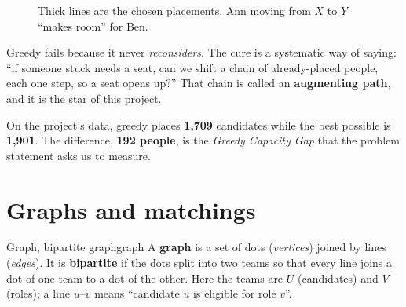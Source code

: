 \documentclass[11pt]{article}
\begin{document}
\begin{figure}[h]
\centering
{}
\caption{Thick lines are the chosen placements. Ann moving from $X$ to $Y$ ``makes room'' for Ben.}
\end{figure}

\begin{keyidea}
Greedy fails because it never \emph{reconsiders}. The cure is a systematic way of saying: ``if someone stuck needs a seat, can we shift a chain of already-placed people, each one step, so a seat opens up?'' That chain is called an \textbf{augmenting path}, and it is the star of this project.
\end{keyidea}

On the project's data, greedy places \textbf{1{,}709} candidates while the best possible is \textbf{1{,}901}. The difference, \textbf{192 people}, is the \emph{Greedy Capacity Gap} that the problem statement asks us to measure.

\section{Graphs and matchings}

\begin{definition}{Graph, bipartite graph}{graph}
A \textbf{graph} is a set of dots (\emph{vertices}) joined by lines (\emph{edges}). It is \textbf{bipartite} if the dots split into two teams so that every line joins a dot of one team to a dot of the other. Here the teams are $U$ (candidates) and $V$ (roles); a line $u$--$v$ means ``candidate $u$ is eligible for role $v$''.
\end{definition}
\end{document}
